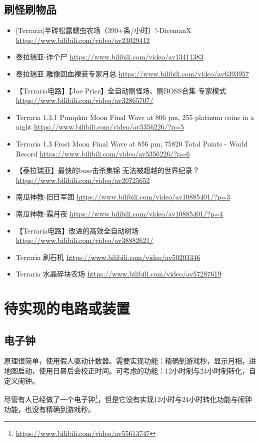 \section{刷怪刷物品}
\begin{itemize}
\item {[}Terraria]半砖松露蠕虫农场（390+条/小时）!-DicemanX \url{https://www.bilibili.com/video/av23029412}
\item 泰拉瑞亚-诈个尸 \url{https://www.bilibili.com/video/av13411383}
\item 泰拉瑞亚 雕像回血裸装专家月总 \url{https://www.bilibili.com/video/av6393957}
\item 【Terraria电路】【Joe Price】全自动刷怪场、刷BOSS合集 专家模式 \url{https://www.bilibili.com/video/av32865707/}
\item Terraria 1.3.1 Pumpkin Moon Final Wave at 806 pm, 255 platinum coins in a night \url{https://www.bilibili.com/video/av5356226/?p=5}
\item Terraria 1.3 Frost Moon Final Wave at 856 pm, 75820 Total Points - World Record \url{https://www.bilibili.com/video/av5356226/?p=6}
\item 【泰拉瑞亚】最快的boss击杀集锦 无法被超越的世界纪录？ \url{https://www.bilibili.com/video/av20725652}
\item 南瓜神教-旧日军团 \url{https://www.bilibili.com/video/av10885401/?p=3}
\item 南瓜神教-霜月夜 \url{https://www.bilibili.com/video/av10885401/?p=4}
\item 【Terraria电路】改进的高效全自动树场 \url{https://www.bilibili.com/video/av38882621/}
\item Terraria 刷石机 \url{https://www.bilibili.com/video/av50203346}
\item Terraria 水晶碎块农场 \url{https://www.bilibili.com/video/av57287619}
\end{itemize}

\chapter{待实现的电路或装置}

\section{电子钟}
原理很简单，使用假人驱动计数器。需要实现功能：精确到游戏秒，显示月相，进地图启动，使用日晷后会校正时间。可考虑的功能：12小时制与24小时制转化，自定义闹钟。

尽管有人已经做了一个电子钟\footnote{\url{https://www.bilibili.com/video/av55613747}}，但是它没有实现12小时与24小时转化功能与闹钟功能，也没有精确到游戏秒。

